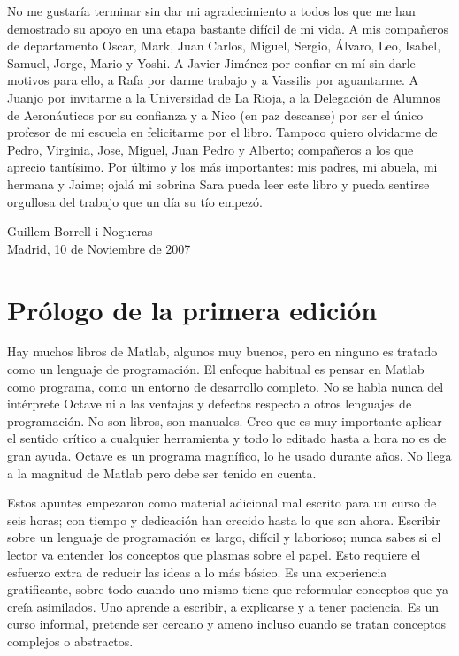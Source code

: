 \documentclass[10pt,fleqn,a4]{book}
\begin{document}
No me gustaría terminar sin dar mi agradecimiento a todos los que me
han demostrado su apoyo en una etapa bastante difícil de mi vida.  A
mis compañeros de departamento Oscar, Mark, Juan Carlos, Miguel,
Sergio, Álvaro, Leo, Isabel, Samuel, Jorge, Mario y Yoshi. A Javier
Jiménez por confiar en mí sin darle motivos para ello, a Rafa por
darme trabajo y a Vassilis por aguantarme. A Juanjo por invitarme a la
Universidad de La Rioja, a la Delegación de Alumnos de Aeronáuticos
por su confianza y a Nico (en paz descanse) por ser el único profesor
de mi escuela en felicitarme por el libro. Tampoco quiero olvidarme de
Pedro, Virginia, Jose, Miguel, Juan Pedro y Alberto; compañeros a los
que aprecio tantísimo.  Por último y los más importantes: mis padres,
mi abuela, mi hermana y Jaime; ojalá mi sobrina Sara pueda leer este
libro y pueda sentirse orgullosa del trabajo que un día su tío empezó.

\vspace{2cm}
\begin{flushright}
Guillem Borrell i Nogueras\\
Madrid, 10 de Noviembre de 2007
\end{flushright}

\chapter*{Prólogo de la primera edición}

Hay muchos libros de Matlab, algunos muy buenos, pero en ninguno es
tratado como un lenguaje de programación. El enfoque habitual es
pensar en Matlab como programa, como un entorno de desarrollo
completo. No se habla nunca del intérprete Octave ni a las ventajas y
defectos respecto a otros lenguajes de programación. No son libros,
son manuales.  Creo que es muy importante aplicar el sentido crítico a
cualquier herramienta y todo lo editado hasta a hora no es de gran
ayuda. Octave es un programa magnífico, lo he usado durante años. No
llega a la magnitud de Matlab pero debe ser tenido en cuenta.

Estos apuntes empezaron como material adicional mal escrito para un
curso de seis horas; con tiempo y dedicación han crecido hasta lo que
son ahora. Escribir sobre un lenguaje de programación es largo,
difícil y laborioso; nunca sabes si el lector va entender los
conceptos que plasmas sobre el papel. Esto requiere el esfuerzo extra
de reducir las ideas a lo más básico. Es una experiencia gratificante,
sobre todo cuando uno mismo tiene que reformular conceptos que ya
creía asimilados. Uno aprende a escribir, a explicarse y a tener
paciencia.  Es un curso informal, pretende ser cercano y ameno incluso
cuando se tratan conceptos complejos o abstractos.
\end{document}
